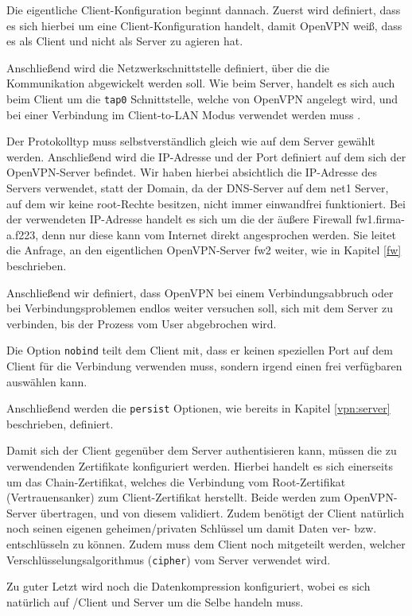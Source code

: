 Die eigentliche Client-Konfiguration beginnt dannach. Zuerst wird definiert, dass es sich hierbei um eine Client-Konfiguration handelt, damit OpenVPN weiß, dass es als Client und nicht als Server zu agieren hat.

Anschließend wird die Netzwerkschnittstelle definiert, über die die Kommunikation abgewickelt werden soll. Wie beim Server, handelt es sich auch beim Client um die \texttt{tap0} Schnittstelle, welche von OpenVPN angelegt wird, und bei einer Verbindung im Client-to-LAN Modus verwendet werden muss \cite{OpenVPN}.

Der Protokolltyp muss selbstverständlich gleich wie auf dem Server gewählt werden. Anschließend wird die IP-Adresse und der Port definiert auf dem sich der OpenVPN-Server befindet. Wir haben hierbei absichtlich die IP-Adresse des Servers verwendet, statt der Domain, da der DNS-Server auf dem net1 Server, auf dem wir keine root-Rechte besitzen, nicht immer einwandfrei funktioniert. Bei der verwendeten IP-Adresse handelt es sich um die der äußere Firewall fw1.firma-a.f223, denn nur diese kann vom Internet direkt angesprochen werden. Sie leitet die Anfrage, an den eigentlichen OpenVPN-Server fw2 weiter, wie in Kapitel \ref{fw} beschrieben.

Anschließend wir definiert, dass OpenVPN bei einem Verbindungsabbruch oder bei Verbindungsproblemen endlos weiter versuchen soll, sich mit dem Server zu verbinden, bis der Prozess vom User abgebrochen wird.

Die Option \texttt{nobind} teilt dem Client mit, dass er keinen speziellen Port auf dem Client für die Verbindung verwenden muss, sondern irgend einen frei verfügbaren auswählen kann.

Anschließend werden die \texttt{persist} Optionen, wie bereits in Kapitel \ref{vpn:server} beschrieben, definiert.

Damit sich der Client gegenüber dem Server authentisieren kann, müssen die zu verwendenden Zertifikate konfiguriert werden. Hierbei handelt es sich einerseits um das Chain-Zertifikat, welches die Verbindung vom Root-Zertifikat (Vertrauensanker) zum Client-Zertifikat herstellt. Beide werden zum OpenVPN-Server übertragen, und von diesem validiert. Zudem benötigt der Client natürlich noch seinen eigenen geheimen/privaten Schlüssel um damit Daten ver- bzw. entschlüsseln zu können. Zudem muss dem Client noch mitgeteilt werden, welcher Verschlüsselungsalgorithmus (\texttt{cipher}) vom Server verwendet wird.

Zu guter Letzt wird noch die Datenkompression konfiguriert, wobei es sich natürlich auf /Client und Server um die Selbe handeln muss.

